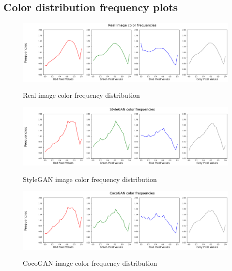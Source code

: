 \documentclass{article}
\begin{document}
    \subsection{Color distribution frequency plots}
     \begin{figure}[H]
          \centering
          \includegraphics[scale=0.35]{color-distributions/real_color_freq.png}\\
          \caption{Real image color frequency distribution}
    \end{figure}
     \begin{figure}[H]
          \centering
          \includegraphics[scale=0.35]{color-distributions/stylegan_color_freq.png}\\
          \caption{StyleGAN image color frequency distribution}
    \end{figure}
     \begin{figure}[H]
          \centering
          \includegraphics[scale=0.35]{color-distributions/cocogan_color_freq.png}\\
          \caption{CocoGAN image color frequency distribution}
    \end{figure}
\end{document}
